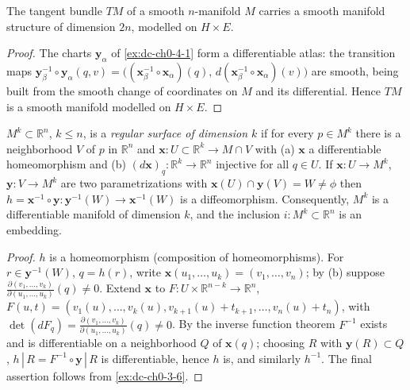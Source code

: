 \begin{lemma}
  \label{lem:dc-ch0-4-1-manifold}
  \leanok
  The tangent bundle $TM$ of a smooth $n$-manifold $M$ carries a smooth manifold
  structure of dimension $2n$, modelled on $H\times E$.
\end{lemma}
\begin{proof}
  \sketch
  \leanok
  The charts $\mathbf{y}_\alpha$ of \cref{ex:dc-ch0-4-1} form a differentiable
  atlas: the transition maps
  $\mathbf{y}_\beta^{-1}\circ\mathbf{y}_\alpha(q,v)=\big((\mathbf{x}_\beta^{-1}\circ\mathbf{x}_\alpha)(q),\,d(\mathbf{x}_\beta^{-1}\circ\mathbf{x}_\alpha)(v)\big)$
  are smooth, being built from the smooth change of coordinates on $M$ and its
  differential. Hence $TM$ is a smooth manifold modelled on $H\times E$.
\end{proof}

\begin{example}
  \label{ex:dc-ch0-4-2}
  \notready
  $M^k\subset\mathbb{R}^n$, $k\le n$, is a \emph{regular surface of dimension $k$} if for
  every $p\in M^k$ there is a neighborhood $V$ of $p$ in $\mathbb{R}^n$ and
  $\mathbf{x}:U\subset\mathbb{R}^k\to M\cap V$ with (a) $\mathbf{x}$ a
  differentiable homeomorphism and (b) $(d\mathbf{x})_q:\mathbb{R}^k\to\mathbb{R}^n$
  injective for all $q\in U$. If
  $\mathbf{x}:U\to M^k$, $\mathbf{y}:V\to M^k$ are two parametrizations with
  $\mathbf{x}(U)\cap\mathbf{y}(V)=W\neq\phi$ then
  $h=\mathbf{x}^{-1}\circ\mathbf{y}:\mathbf{y}^{-1}(W)\to\mathbf{x}^{-1}(W)$ is a
  diffeomorphism. Consequently, $M^k$ is a differentiable manifold of dimension
  $k$, and the inclusion $i:M^k\subset\mathbb{R}^n$ is an embedding.
\end{example}
\begin{proof}
  \sketch
  $h$ is a homeomorphism (composition of homeomorphisms). For
  $r\in\mathbf{y}^{-1}(W)$, $q=h(r)$, write
  $\mathbf{x}(u_1,\dots,u_k)=(v_1,\dots,v_n)$; by (b) suppose
  $\frac{\partial(v_1,\dots,v_k)}{\partial(u_1,\dots,u_k)}(q)\neq0$. Extend
  $\mathbf{x}$ to $F:U\times\mathbb{R}^{n-k}\to\mathbb{R}^n$,
  $F(u,t)=(v_1(u),\dots,v_k(u),v_{k+1}(u)+t_{k+1},\dots,v_n(u)+t_n)$, with
  $\det(dF_q)=\frac{\partial(v_1,\dots,v_k)}{\partial(u_1,\dots,u_k)}(q)\neq0$. By
  the inverse function theorem $F^{-1}$ exists and is differentiable on a
  neighborhood $Q$ of $\mathbf{x}(q)$; choosing $R$ with $\mathbf{y}(R)\subset Q$,
  $h\,|\,R=F^{-1}\circ\mathbf{y}\,|\,R$ is differentiable, hence $h$ is, and
  similarly $h^{-1}$. The final assertion follows from
  \cref{ex:dc-ch0-3-6}.
\end{proof}


